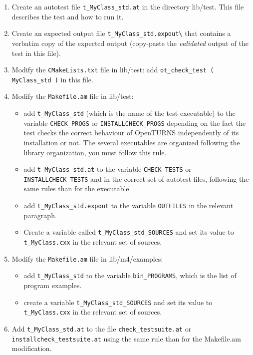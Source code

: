 \documentclass[11pt]{article}
\begin{document}
\begin{enumerate}
\item Create an autotest file \verb!t_MyClass_std.at! in the directory lib/test. This file describes the test and how to run it.

\item Create an expected output file \verb!t_MyClass_std.expout\! that contains a verbatim copy of the expected output (copy-paste the \emph{validated} output of the test in this file).

\item Modify the \verb!CMakeLists.txt! file in lib/test: add \verb!ot_check_test ( MyClass_std )! in this file.

\item Modify the \verb!Makefile.am! file in lib/test:
  \begin{itemize}
  \item add \verb!t_MyClass_std! (which is the name of the test executable) to the variable \verb!CHECK_PROGS! or \verb!INSTALLCHECK_PROGS! depending on the fact the test checks the correct behaviour of OpenTURNS independently of its installation or not. The several executables are organized following the library organization, you must follow this rule.
  \item add \verb!t_MyClass_std.at! to the variable \verb!CHECK_TESTS! or \verb!INSTALLCHECK_TESTS! and in the correct set of autotest files, following the same rules than for the executable.
  \item add \verb!t_MyClass_std.expout! to the variable \verb!OUTFILES! in the relevant paragraph.
  \item Create a variable called \verb!t_MyClass_std_SOURCES! and set its value to \verb!t_MyClass.cxx! in the relevant set of sources.
  \end{itemize}
  
\item Modify the \verb!Makefile.am! file in lib/m4/examples:
  \begin{itemize}
  \item add \verb!t_MyClass_std! to the variable \verb!bin_PROGRAMS!, which is the list of program examples.
  \item create a variable \verb!t_MyClass_std_SOURCES! and set its value to \verb!t_MyClass.cxx! in the relevant set of sources.
  \end{itemize}
  
\item Add \verb!t_MyClass_std.at! to the file \verb!check_testsuite.at! or \verb!installcheck_testsuite.at! using the same rule than for the Makefile.am modification.
  

\end{enumerate}
\end{document}
